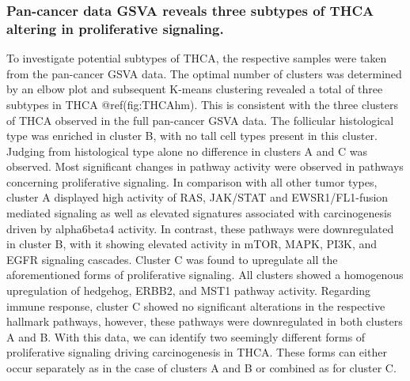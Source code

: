 \documentclass[
]{article}
\begin{document}
\hypertarget{pan-cancer-data-gsva-reveals-three-subtypes-of-thca-altering-in-proliferative-signaling.}{%
\subsubsection{Pan-cancer data GSVA reveals three subtypes of THCA
altering in proliferative
signaling.}\label{pan-cancer-data-gsva-reveals-three-subtypes-of-thca-altering-in-proliferative-signaling.}}

To investigate potential subtypes of THCA, the respective samples were
taken from the pan-cancer GSVA data. The optimal number of clusters was
determined by an elbow plot and subsequent K-means clustering revealed a
total of three subtypes in THCA @ref(fig:THCAhm). This is consistent
with the three clusters of THCA observed in the full pan-cancer GSVA
data. The follicular histological type was enriched in cluster B, with
no tall cell types present in this cluster. Judging from histological
type alone no difference in clusters A and C was observed. Most
significant changes in pathway activity were observed in pathways
concerning proliferative signaling. In comparison with all other tumor
types, cluster A displayed high activity of RAS, JAK/STAT and
EWSR1/FL1-fusion mediated signaling as well as elevated signatures
associated with carcinogenesis driven by alpha6beta4 activity. In
contrast, these pathways were downregulated in cluster B, with it
showing elevated activity in mTOR, MAPK, PI3K, and EGFR signaling
cascades. Cluster C was found to upregulate all the aforementioned forms
of proliferative signaling. All clusters showed a homogenous
upregulation of hedgehog, ERBB2, and MST1 pathway activity. Regarding
immune response, cluster C showed no significant alterations in the
respective hallmark pathways, however, these pathways were downregulated
in both clusters A and B. With this data, we can identify two seemingly
different forms of proliferative signaling driving carcinogenesis in
THCA. These forms can either occur separately as in the case of clusters
A and B or combined as for cluster C.
\end{document}
